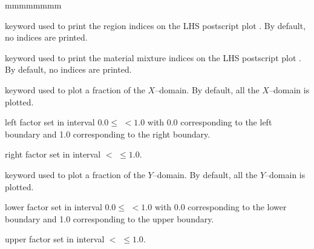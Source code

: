 \begin{ListeDeDescription}{mmmmmmmm}
\item[\moc{DRAWNOD}] keyword used to print the region indices on the LHS postscript plot . By default, no indices are printed.

\item[\moc{DRAWMIX}] keyword used to print the material mixture indices on the LHS postscript plot . By default, no indices are printed.

\item[\moc{ZOOMX}] keyword used to plot a fraction of the $X$--domain. By default, all the $X$--domain is plotted.

\item[\dusa{facx1}] left factor set in interval $0.0 \le$  $< 1.0$ with 0.0 corresponding to the left boundary and 1.0 corresponding to the right boundary.

\item[\dusa{facx2}] right factor set in interval  $<$  $\le 1.0$.

\item[\moc{ZOOMY}] keyword used to plot a fraction of the $Y$--domain. By default, all the $Y$--domain is plotted.

\item[\dusa{facy1}] lower factor set in interval  $0.0 \le$  $< 1.0$ with 0.0 corresponding to the lower boundary and 1.0 corresponding to the upper boundary.

\item[\dusa{facy2}] upper factor set in interval  $<$  $\le 1.0$.

\end{ListeDeDescription}


\clearpage
